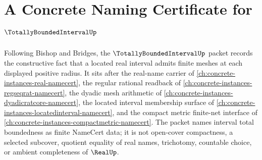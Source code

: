 \chapter{A Concrete Naming Certificate for $\TotallyBoundedIntervalUp$}
\label{ch:concrete-instances-totally-bounded-interval-namecert}

Following Bishop and Bridges, the $\TotallyBoundedIntervalUp$ packet records the constructive fact that a located real interval admits finite meshes at each displayed positive radius. It sits after the real-name carrier of \autoref{ch:concrete-instances-real-namecert}, the regular rational readback of \autoref{ch:concrete-instances-regseqrat-namecert}, the dyadic mesh arithmetic of \autoref{ch:concrete-instances-dyadicratcore-namecert}, the located interval membership surface of \autoref{ch:concrete-instances-locatedinterval-namecert}, and the compact metric finite-net interface of \autoref{ch:concrete-instances-compactmetric-namecert}. The packet names interval total boundedness as finite NameCert data; it is not open-cover compactness, a selected subcover, quotient equality of real names, trichotomy, countable choice, or ambient completeness of $\RealUp$.

